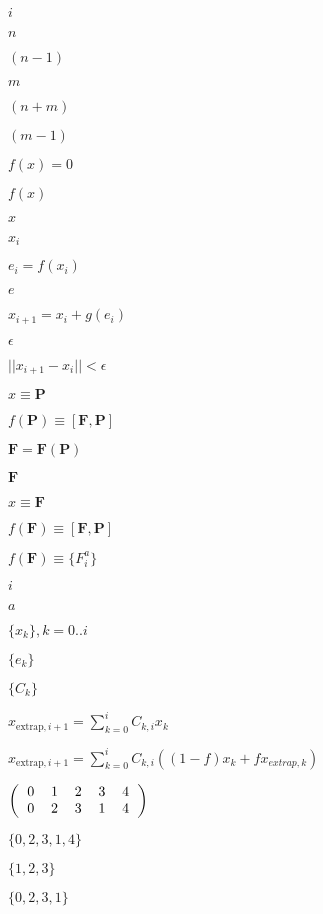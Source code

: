 \documentclass{article}
\begin{document}
$i$
\pagebreak

$n$
\pagebreak

$(n-1)$
\pagebreak

$m$
\pagebreak

$(n + m)$
\pagebreak

$(m-1)$
\pagebreak

$ f(x) = 0 $
\pagebreak

$ f(x) $
\pagebreak

$ x $
\pagebreak

$ x_i $
\pagebreak

$ e_i = f(x_i) $
\pagebreak

$ e $
\pagebreak

$ x_{i+1} = x_i + g(e_i) $
\pagebreak

$ \epsilon $
\pagebreak

$ ||x_{i+1} - x_i|| < \epsilon $
\pagebreak

$ x \equiv \mathbf{P} $
\pagebreak

$ f(\mathbf{P}) \equiv [\mathbf{F}, \mathbf{P}] $
\pagebreak

$ \mathbf{F} = \mathbf{F}(\mathbf{P}) $
\pagebreak

$ \mathbf{F} $
\pagebreak

$ x \equiv \mathbf{F} $
\pagebreak

$ f(\mathbf{F}) \equiv [\mathbf{F}, \mathbf{P}] $
\pagebreak

$ f(\mathbf{F}) \equiv \{ F_i^a \} $
\pagebreak

$ i $
\pagebreak

$ a $
\pagebreak

$ \{ x_k \}, k=0..i $
\pagebreak

$ \{ e_k \} $
\pagebreak

$ \{ C_k \} $
\pagebreak

$ x_{\mathrm{extrap},i+1} = \sum\limits_{k=0}^i C_{k,i} x_{k} $
\pagebreak

$ x_{\mathrm{extrap},i+1} = \sum\limits_{k=0}^i C_{k,i} ( (1-f) x_{k} + f x_{extrap,k} ) $
\pagebreak

$ \left( \begin{tabular}{ccccc} 0 & 1 & 2 & 3 & 4 \\ 0 & 2 & 3 & 1 & 4 \end{tabular} \right) $
\pagebreak

$ \{0, 2, 3, 1, 4\} $
\pagebreak

$ \{1, 2, 3\} $
\pagebreak

$ \{0, 2, 3, 1\} $
\pagebreak
\end{document}
